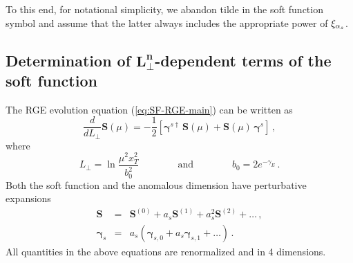 \documentclass[a4paper,11pt]{report}
\numberwithin{equation}{section}
\newcommand{\bfS}{\bm{S}}
\newcommand{\bfZ}{\bm{Z}}
\newcommand{\bfgamma}{\bm{\gamma}}
\begin{document}
To this end, for notational simplicity, we abandon tilde in the soft function
symbol and assume that the latter always includes the appropriate power of
$\xi_{\alpha_s}$.




\subsection{Determination of $\mathbold{L_\perp^n}$-dependent terms of the soft
function}
\label{sec:RGevolution}


The RGE evolution equation (\ref{eq:SF-RGE-main}) can be written as
%
\begin{equation}
  \frac{d}{d L_\perp} \bfS(\mu) =
  - \frac{1}{2} \left[
  \bfgamma^{s \dagger}\,\bfS(\mu)  
  + \bfS(\mu)\, \bfgamma^{s}
  \right]\,,
  \label{eq:SF-RGE-Lp}
\end{equation}
%
where
%
\begin{equation}
  L_\perp = \ln\frac{\mu^2 x_T^2}{b_0^2}
  \qquad \qquad
  \text{and}
  \qquad \qquad
  b_0 =  2 e^{- \gamma_E}\,.
\end{equation}
%
Both the soft function and the anomalous dimension have perturbative expansions
%
\begin{eqnarray}
  \bfS  & = &
  \bfS^{(0)} + a_s \bfS^{(1)} + a_s^2 \bfS^{(2)} + \ldots\,,
  \label{eq:Sren-exp}
  \\
  \bfgamma_{s} & = &
  a_s \left(\bfgamma_{s,0} + a_s \bfgamma_{s,1}+ \ldots\right)\,.
  \label{eq:gammas-exp}
\end{eqnarray}
%
All quantities in the above equations are renormalized and in 4 dimensions.
 
\end{document}
